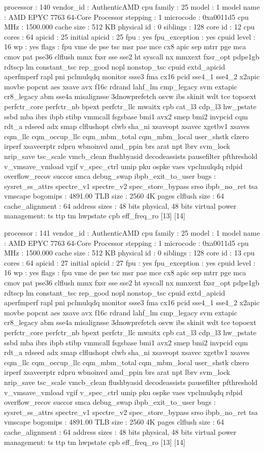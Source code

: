 processor	: 140
vendor_id	: AuthenticAMD
cpu family	: 25
model		: 1
model name	: AMD EPYC 7763 64-Core Processor
stepping	: 1
microcode	: 0xa0011d5
cpu MHz		: 1500.000
cache size	: 512 KB
physical id	: 0
siblings	: 128
core id		: 12
cpu cores	: 64
apicid		: 25
initial apicid	: 25
fpu		: yes
fpu_exception	: yes
cpuid level	: 16
wp		: yes
flags		: fpu vme de pse tsc msr pae mce cx8 apic sep mtrr pge mca cmov pat pse36 clflush mmx fxsr sse sse2 ht syscall nx mmxext fxsr_opt pdpe1gb rdtscp lm constant_tsc rep_good nopl nonstop_tsc cpuid extd_apicid aperfmperf rapl pni pclmulqdq monitor ssse3 fma cx16 pcid sse4_1 sse4_2 x2apic movbe popcnt aes xsave avx f16c rdrand lahf_lm cmp_legacy svm extapic cr8_legacy abm sse4a misalignsse 3dnowprefetch osvw ibs skinit wdt tce topoext perfctr_core perfctr_nb bpext perfctr_llc mwaitx cpb cat_l3 cdp_l3 hw_pstate ssbd mba ibrs ibpb stibp vmmcall fsgsbase bmi1 avx2 smep bmi2 invpcid cqm rdt_a rdseed adx smap clflushopt clwb sha_ni xsaveopt xsavec xgetbv1 xsaves cqm_llc cqm_occup_llc cqm_mbm_total cqm_mbm_local user_shstk clzero irperf xsaveerptr rdpru wbnoinvd amd_ppin brs arat npt lbrv svm_lock nrip_save tsc_scale vmcb_clean flushbyasid decodeassists pausefilter pfthreshold v_vmsave_vmload vgif v_spec_ctrl umip pku ospke vaes vpclmulqdq rdpid overflow_recov succor smca debug_swap ibpb_exit_to_user
bugs		: sysret_ss_attrs spectre_v1 spectre_v2 spec_store_bypass srso ibpb_no_ret tsa vmscape
bogomips	: 4891.00
TLB size	: 2560 4K pages
clflush size	: 64
cache_alignment	: 64
address sizes	: 48 bits physical, 48 bits virtual
power management: ts ttp tm hwpstate cpb eff_freq_ro [13] [14]

processor	: 141
vendor_id	: AuthenticAMD
cpu family	: 25
model		: 1
model name	: AMD EPYC 7763 64-Core Processor
stepping	: 1
microcode	: 0xa0011d5
cpu MHz		: 1500.000
cache size	: 512 KB
physical id	: 0
siblings	: 128
core id		: 13
cpu cores	: 64
apicid		: 27
initial apicid	: 27
fpu		: yes
fpu_exception	: yes
cpuid level	: 16
wp		: yes
flags		: fpu vme de pse tsc msr pae mce cx8 apic sep mtrr pge mca cmov pat pse36 clflush mmx fxsr sse sse2 ht syscall nx mmxext fxsr_opt pdpe1gb rdtscp lm constant_tsc rep_good nopl nonstop_tsc cpuid extd_apicid aperfmperf rapl pni pclmulqdq monitor ssse3 fma cx16 pcid sse4_1 sse4_2 x2apic movbe popcnt aes xsave avx f16c rdrand lahf_lm cmp_legacy svm extapic cr8_legacy abm sse4a misalignsse 3dnowprefetch osvw ibs skinit wdt tce topoext perfctr_core perfctr_nb bpext perfctr_llc mwaitx cpb cat_l3 cdp_l3 hw_pstate ssbd mba ibrs ibpb stibp vmmcall fsgsbase bmi1 avx2 smep bmi2 invpcid cqm rdt_a rdseed adx smap clflushopt clwb sha_ni xsaveopt xsavec xgetbv1 xsaves cqm_llc cqm_occup_llc cqm_mbm_total cqm_mbm_local user_shstk clzero irperf xsaveerptr rdpru wbnoinvd amd_ppin brs arat npt lbrv svm_lock nrip_save tsc_scale vmcb_clean flushbyasid decodeassists pausefilter pfthreshold v_vmsave_vmload vgif v_spec_ctrl umip pku ospke vaes vpclmulqdq rdpid overflow_recov succor smca debug_swap ibpb_exit_to_user
bugs		: sysret_ss_attrs spectre_v1 spectre_v2 spec_store_bypass srso ibpb_no_ret tsa vmscape
bogomips	: 4891.00
TLB size	: 2560 4K pages
clflush size	: 64
cache_alignment	: 64
address sizes	: 48 bits physical, 48 bits virtual
power management: ts ttp tm hwpstate cpb eff_freq_ro [13] [14]

